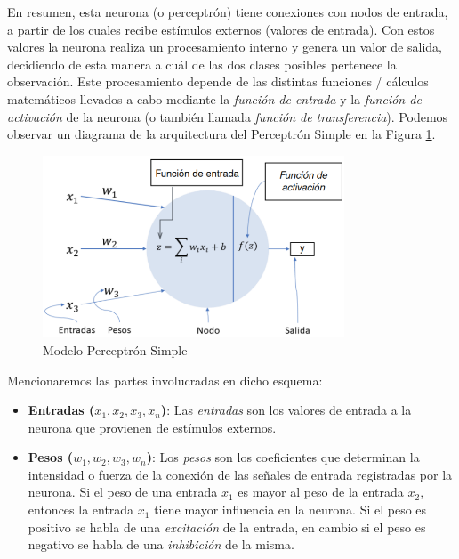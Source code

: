\documentclass[12pt,a4paper]{article}
\begin{document}
\begin{sloppypar}
En resumen, esta neurona (o perceptrón) tiene conexiones con nodos de entrada, a partir de los cuales recibe estímulos externos (valores de entrada). Con estos valores la neurona realiza un procesamiento interno y genera un valor de salida, decidiendo de esta manera a cuál de las dos clases posibles pertenece la observación\cite{ANN_21}. Este procesamiento depende de las distintas funciones / cálculos matemáticos llevados a cabo mediante la \textit{función de entrada} y la \textit{función de activación} de la neurona (o también llamada \textit{función de transferencia})\cite{ANN_22}. Podemos observar un diagrama de la arquitectura del Perceptrón Simple en la Figura \ref{fig:ann_1}. 

\begin{figure}[H]    %
 \centering
 \includegraphics[width=0.8\textwidth]{images/ANN/1-ANN.png}
 \caption{Modelo Perceptrón Simple} 
 \label{fig:ann_1}
\end{figure}

Mencionaremos las partes involucradas en dicho esquema:
\begin{itemize}
\item \textbf{Entradas ($x_1, x_2, x_3, x_n$)}: Las \textit{entradas} son los valores de entrada a la neurona que provienen de estímulos externos. 

\item \textbf{Pesos ($w_1, w_2, w_3, w_n$)}: Los \textit{pesos} son los coeficientes que determinan la intensidad o fuerza de la conexión de las señales de entrada registradas por la neurona. Si el peso de una entrada $x_1$ es mayor al peso de la entrada $x_2$, entonces la entrada $x_1$ tiene mayor influencia en la neurona. Si el peso es positivo se habla de una \textit{excitación} de la entrada, en cambio si el peso es negativo se habla de una \textit{inhibición} de la misma.


\end{itemize}
\end{sloppypar}
\end{document}
